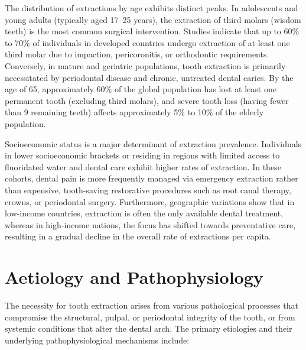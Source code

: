 The distribution of extractions by age exhibits distinct peaks. In adolescents and young adults (typically aged 17--25 years), the extraction of third molars (wisdom teeth) is the most common surgical intervention. Studies indicate that up to 60\% to 70\% of individuals in developed countries undergo extraction of at least one third molar due to impaction, pericoronitis, or orthodontic requirements. Conversely, in mature and geriatric populations, tooth extraction is primarily necessitated by periodontal disease and chronic, untreated dental caries. By the age of 65, approximately 60\% of the global population has lost at least one permanent tooth (excluding third molars), and severe tooth loss (having fewer than 9 remaining teeth) affects approximately 5\% to 10\% of the elderly population.

Socioeconomic status is a major determinant of extraction prevalence. Individuals in lower socioeconomic brackets or residing in regions with limited access to fluoridated water and dental care exhibit higher rates of extraction. In these cohorts, dental pain is more frequently managed via emergency extraction rather than expensive, tooth-saving restorative procedures such as root canal therapy, crowns, or periodontal surgery. Furthermore, geographic variations show that in low-income countries, extraction is often the only available dental treatment, whereas in high-income nations, the focus has shifted towards preventative care, resulting in a gradual decline in the overall rate of extractions per capita.

\section*{Aetiology and Pathophysiology}
The necessity for tooth extraction arises from various pathological processes that compromise the structural, pulpal, or periodontal integrity of the tooth, or from systemic conditions that alter the dental arch. The primary etiologies and their underlying pathophysiological mechanisms include:

